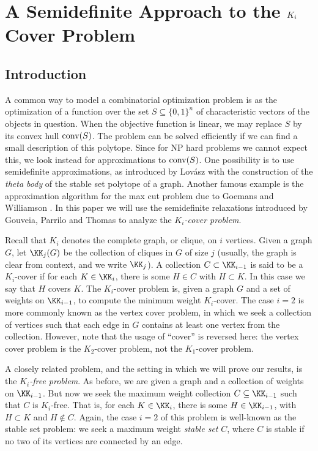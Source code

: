 \chapter{A Semidefinite Approach to the $K_\MakeLowercase{i}$ Cover Problem}
\label{chap:kicover}


\section{Introduction}
A common way to model a combinatorial optimization problem is as the optimization of a function over the set $S \subseteq \{0,1\}^n$ of  characteristic vectors of the objects in question. When the objective function is linear, 
we may replace $S$ by its convex hull $\hbox{conv}(S)$. The problem can be solved efficiently if we can find a small description of this polytope. Since for NP hard problems we cannot expect this, we look instead for  approximations to $\hbox{conv}(S)$. One possibility is to use semidefinite approximations, as introduced by Lov\'{a}sz \cite{lovasz} with the construction of the {\em theta body} of the stable set polytope of a graph. Another famous example is the approximation algorithm for the max cut problem due to Goemans and Williamson \cite{goemans_williamson}. In this paper we will use the semidefinite relaxations introduced by Gouveia, Parrilo and Thomas \cite{gpt} to analyze the {\em $K_i$-cover problem}.

Recall that $K_i$ denotes the complete graph, or clique, on $i$ vertices. Given a graph $G$, let $\KK_j(G)$ be the collection of cliques in $G$ of size $j$ (usually, the graph is clear from context, and we write $\KK_j$). A collection $C \subset \KK_{i-1}$ is said to be a $K_i$-cover if for each $K \in \KK_i$, there is some $H \in C$ with $H \subset K$. In this case we say that $H$ covers $K$. The $K_i$-cover problem is, given a graph $G$ and a set of weights on $\KK_{i-1}$, to compute the minimum weight $K_i$-cover. The case $i=2$ is more commonly known as the vertex cover problem, in which we seek a collection of vertices such that each edge in $G$ contains at least one vertex from the collection. However, note that the usage of ``cover'' is reversed here: the vertex cover problem is the $K_2$-cover problem, not the $K_1$-cover problem.

A closely related problem, and the setting in which we will prove our results, is the {\em $K_i$-free problem}. As before, we are given a graph and a collection of weights on $\KK_{i-1}$. But now we seek the maximum weight collection $C \subseteq \KK_{i-1}$ such that $C$ is $K_i$-free. That is, for each $K \in \KK_i$, there is some $H \in \KK_{i-1}$, with $H \subset K$ and $H \notin C$. Again, the case $i=2$ of this problem is well-known as the stable set problem: we seek a maximum weight {\em stable set} $C$, where $C$ is stable if no two of its vertices are connected by an edge.

